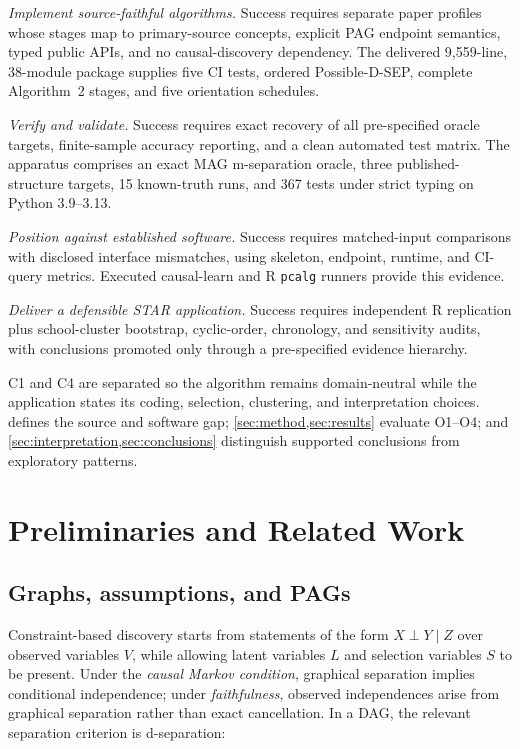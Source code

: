 \documentclass[11pt,a4paper]{article}
\theoremstyle{definition}
\newcommand{\code}[1]{\texttt{#1}}
\begin{document}
\begin{description}[leftmargin=2.1em,itemsep=0.1em,topsep=0.2em,
  font=\normalfont\bfseries]
\item[O1/C1.] \emph{Implement source-faithful algorithms.} Success requires
separate paper profiles whose stages map to primary-source concepts, explicit
PAG endpoint semantics, typed public APIs, and no causal-discovery dependency.
The delivered 9,559-line, 38-module package supplies five CI tests, ordered
Possible-D-SEP, complete Algorithm~2 stages, and five orientation schedules.
\item[O2/C2.] \emph{Verify and validate.} Success requires exact recovery of
all pre-specified oracle targets, finite-sample accuracy reporting, and a clean
automated test matrix. The apparatus comprises an exact MAG m-separation
oracle, three published-structure targets, 15 known-truth runs, and 367 tests
under strict typing on Python 3.9--3.13.
\item[O3/C3.] \emph{Position against established software.} Success requires
matched-input comparisons with disclosed interface mismatches, using skeleton,
endpoint, runtime, and CI-query metrics. Executed causal-learn and R
\code{pcalg} runners provide this evidence.
\item[O4/C4.] \emph{Deliver a defensible STAR application.} Success requires
independent R replication plus school-cluster bootstrap, cyclic-order,
chronology, and sensitivity audits, with conclusions promoted only through a
pre-specified evidence hierarchy.
\end{description}

C1 and C4 are separated so the algorithm remains domain-neutral while the
application states its coding, selection, clustering, and interpretation
choices.  defines the source and software gap;
\cref{sec:method,sec:results} evaluate O1--O4; and
\cref{sec:interpretation,sec:conclusions} distinguish supported conclusions
from exploratory patterns.

\section{Preliminaries and Related Work}
\label{sec:background}

\subsection{Graphs, assumptions, and PAGs}

Constraint-based discovery starts from statements of the form
\(X \perp Y \mid Z\) over observed variables \(V\), while allowing latent
variables \(L\) and selection variables \(S\) to be present. Under the
\emph{causal Markov condition}, graphical separation implies conditional
independence; under \emph{faithfulness}, observed independences arise from
graphical separation rather than exact cancellation. In a DAG, the relevant
separation criterion is d-separation:
\end{document}
